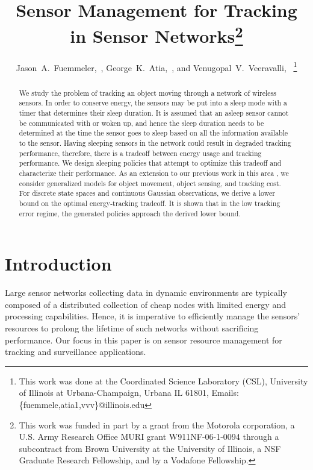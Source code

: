 \documentclass[journal,draftcls,onecolumn,11pt]{IEEEtran}
\title{Sensor Management for Tracking in Sensor Networks\thanks{This work was funded in part by a grant from the Motorola corporation, a U.S. Army Research Office MURI grant W911NF-06-1-0094 through a subcontract from Brown University at the University of Illinois, a NSF Graduate Research Fellowship, and by a Vodafone Fellowship.}}
\author{Jason~A.~Fuemmeler,~\IEEEmembership{Member,~IEEE}, George~K.~Atia,~\IEEEmembership{Member,~IEEE}, and Venugopal~V.~Veeravalli,~\IEEEmembership{Fellow,~IEEE}
\thanks{This work was done at the Coordinated Science Laboratory (CSL), University of Illinois at Urbana-Champaign, Urbana IL 61801, Emails: \{fuemmele,atia1,vvv\}@illinois.edu}}
\date{}
\begin{document}
\maketitle
\begin{abstract}
We study the problem of tracking an object moving through a network of wireless sensors. In order to conserve energy, the sensors may be put into a sleep mode with a timer that determines their sleep duration. It is assumed that an asleep sensor cannot be communicated with or woken up, and hence the sleep duration needs to be determined at the time the sensor goes to sleep based on all the information available to the sensor. Having sleeping sensors in the network could result in degraded tracking performance, therefore, there is a tradeoff between energy usage and tracking performance. We design sleeping policies that attempt to optimize this tradeoff and characterize their performance.  As an extension to our previous work in this area \cite{fuemmeler08}, we consider generalized models for object movement, object sensing, and tracking cost. For discrete state spaces and continuous Gaussian observations, we derive a lower bound on the optimal energy-tracking tradeoff. It is shown that in the low tracking error regime, the generated policies approach the derived lower bound. \end{abstract}

\section{Introduction}
Large sensor networks collecting data in dynamic environments are typically composed of a distributed collection of cheap nodes with limited energy and processing capabilities. Hence, it is imperative to efficiently manage the sensors' resources to prolong the lifetime of such networks without sacrificing performance. Our focus in this paper is on sensor resource management for tracking and surveillance applications.
\end{document}
